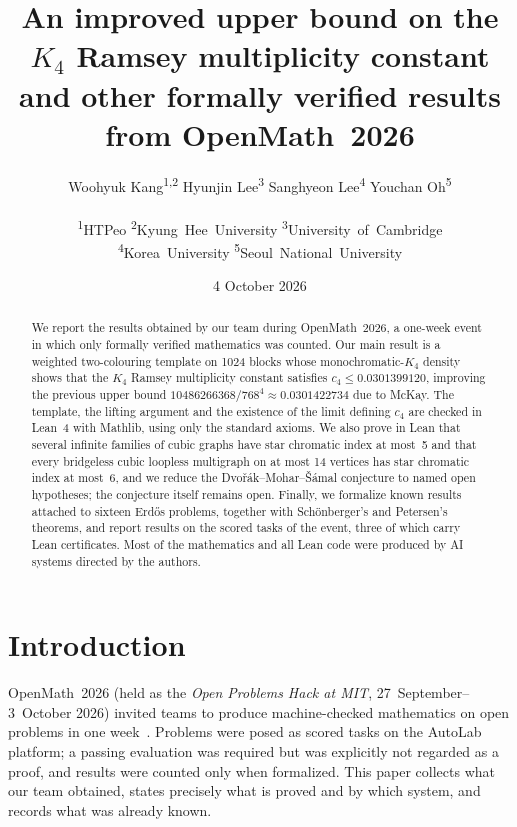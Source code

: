 \documentclass[11pt,a4paper]{article}
\title{An improved upper bound on the $K_4$ Ramsey multiplicity constant\\
and other formally verified results from OpenMath~2026}
\author{Woohyuk Kang\textsuperscript{1,2} \quad Hyunjin Lee\textsuperscript{3} \quad
Sanghyeon Lee\textsuperscript{4} \quad Youchan Oh\textsuperscript{5}\\[6pt]
\parbox{0.8\textwidth}{\centering\small\mbox{\textsuperscript{1}HTPeo} \quad \mbox{\textsuperscript{2}Kyung Hee University} \quad
\mbox{\textsuperscript{3}University of Cambridge}\\ \mbox{\textsuperscript{4}Korea University} \quad
\mbox{\textsuperscript{5}Seoul National University}}}
\date{4 October 2026}
\theoremstyle{remark}
\begin{document}
\maketitle
{\renewcommand{\thefootnote}{}}

\begin{abstract}
We report the results obtained by our team during OpenMath~2026, a one-week event in which only formally verified
mathematics was counted. Our main result is a weighted two-colouring template on 1024 blocks whose monochromatic-$K_4$
density shows that the $K_4$ Ramsey multiplicity constant satisfies $c_4 \le 0.0301399120$, improving the previous
upper bound $10486266368/768^4 \approx 0.0301422734$ due to McKay. The template, the lifting argument and the
existence of the limit defining $c_4$ are checked in Lean~4 with Mathlib, using only the standard axioms. We also
prove in Lean that several infinite families of cubic graphs have star chromatic index at most~5 and that every
bridgeless cubic loopless multigraph on at most 14 vertices has star chromatic index at most~6, and we reduce the
Dvo\v{r}\'ak--Mohar--\v{S}\'amal conjecture to named open hypotheses; the conjecture itself remains open. Finally,
we formalize known results attached to sixteen Erd\H{o}s problems, together with Sch\"onberger's and Petersen's
theorems, and report results on the scored tasks of the event, three of which carry Lean certificates. Most of the
mathematics and all Lean code were produced by AI systems directed by the authors.
\end{abstract}

\section{Introduction}

OpenMath~2026 (held as the \emph{Open Problems Hack at MIT}, 27~September--3~October 2026) invited teams to produce
machine-checked mathematics on open problems in one week~\cite{handbook}. Problems were posed as scored tasks on the
AutoLab platform; a passing evaluation was required but was explicitly not regarded as a proof, and results were
counted only when formalized. This paper collects what our team obtained, states precisely what is proved and by
which system, and records what was already known.
\end{document}
